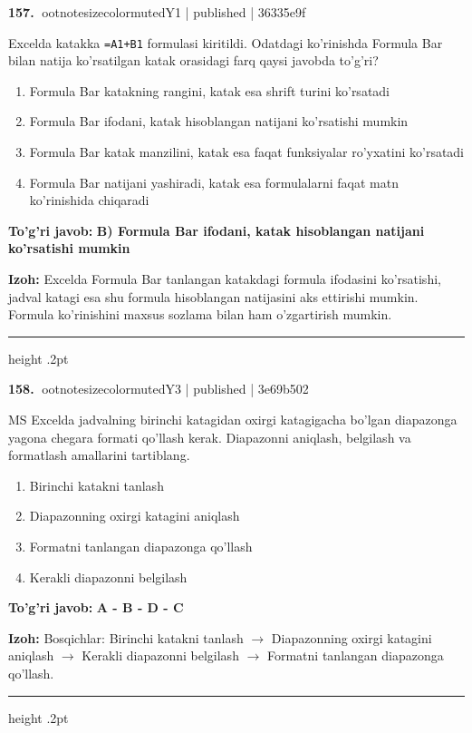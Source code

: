 \documentclass[10pt,a4paper]{article}
\begin{document}
\textbf{\color{ink}157.} {ootnotesizecolor{muted}Y1 | published | 36335e9f}
\par
Excelda katakka \texttt{=A1+B1} formulasi kiritildi. Odatdagi ko'rinishda Formula Bar bilan natija ko'rsatilgan katak orasidagi farq qaysi javobda to'g'ri?
\begin{enumerate}[label=\Alph*),leftmargin=9mm]
\item Formula Bar katakning rangini, katak esa shrift turini ko'rsatadi
\item Formula Bar ifodani, katak hisoblangan natijani ko'rsatishi mumkin
\item Formula Bar katak manzilini, katak esa faqat funksiyalar ro'yxatini ko'rsatadi
\item Formula Bar natijani yashiradi, katak esa formulalarni faqat matn ko'rinishida chiqaradi
\end{enumerate}
\begin{tcolorbox}[enhanced,breakable,colback=teal!4,colframe=teal!55!black,boxrule=0.45pt,arc=1.2mm,left=2.8mm,right=2.8mm,top=2mm,bottom=2mm]
\textbf{\color{teal}To'g'ri javob:} \textbf{B) Formula Bar ifodani, katak hisoblangan natijani ko'rsatishi mumkin}
\par\smallskip
\textbf{Izoh:} Excelda Formula Bar tanlangan katakdagi formula ifodasini ko'rsatishi, jadval katagi esa shu formula hisoblangan natijasini aks ettirishi mumkin. Formula ko'rinishini maxsus sozlama bilan ham o'zgartirish mumkin.
\end{tcolorbox}
\vspace{2mm}\hrule height .2pt\vspace{2mm}

\textbf{\color{ink}158.} {ootnotesizecolor{muted}Y3 | published | 3e69b502}
\par
MS Excelda jadvalning birinchi katagidan oxirgi katagigacha bo'lgan diapazonga yagona chegara formati qo'llash kerak. Diapazonni aniqlash, belgilash va formatlash amallarini tartiblang.
\begin{enumerate}[label=\Alph*),leftmargin=9mm]
\item Birinchi katakni tanlash
\item Diapazonning oxirgi katagini aniqlash
\item Formatni tanlangan diapazonga qo'llash
\item Kerakli diapazonni belgilash
\end{enumerate}
\begin{tcolorbox}[enhanced,breakable,colback=teal!4,colframe=teal!55!black,boxrule=0.45pt,arc=1.2mm,left=2.8mm,right=2.8mm,top=2mm,bottom=2mm]
\textbf{\color{teal}To'g'ri javob:} \textbf{A - B - D - C}
\par\smallskip
\textbf{Izoh:} Bosqichlar: Birinchi katakni tanlash \ensuremath{\rightarrow} Diapazonning oxirgi katagini aniqlash \ensuremath{\rightarrow} Kerakli diapazonni belgilash \ensuremath{\rightarrow} Formatni tanlangan diapazonga qo'llash.
\end{tcolorbox}
\vspace{2mm}\hrule height .2pt\vspace{2mm}
\end{document}
